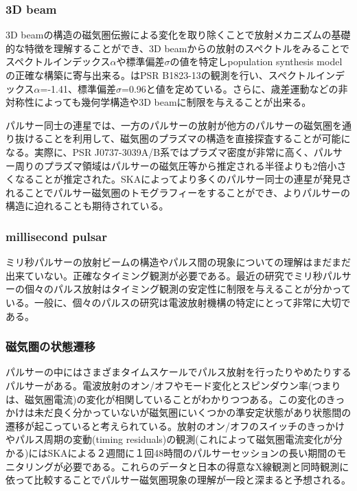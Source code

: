 \subsubsection{3D beam}
3D beamの構造の磁気圏伝搬による変化を取り除くことで放射メカニズムの基礎的な特徴を理解することができ、3D beamからの放射のスペクトルをみることでスペクトルインデックス$\alpha$や標準偏差$\sigma$の値を特定しpopulation synthesis modelの正確な構築に寄与出来る。\cite{Bates13}はPSR B1823-13の観測を行い、スペクトルインデックス$\alpha$=-1.41、標準偏差$\sigma$=0.96と値を定めている。さらに、歳差運動などの非対称性によっても幾何学構造や3D beamに制限を与えることが出来る。

パルサー同士の連星では、一方のパルサーの放射が他方のパルサーの磁気圏を通り抜けることを利用して、磁気圏のプラズマの構造を直接探査することが可能になる。実際に、PSR J0737-3039A/B系ではプラズマ密度が非常に高く、パルサー周りのプラズマ領域はパルサーの磁気圧等から推定される半径よりも2倍小さくなることが推定された\citep{Breton12}。SKAによってより多くのパルサー同士の連星が発見されることでパルサー磁気圏のトモグラフィーをすることができ、よりパルサーの構造に迫れることも期待されている。

\subsubsection{millisecond pulsar}
ミリ秒パルサーの放射ビームの構造やパルス間の現象についての理解はまだまだ出来ていない。正確なタイミング観測が必要である。最近の研究でミリ秒パルサーの個々のパルス放射はタイミング観測の安定性に制限を与えることが分かっている\citep{Oslowski14}。一般に、個々のパルスの研究は電波放射機構の特定にとって非常に大切である。

\subsubsection{磁気圏の状態遷移}
パルサーの中にはさまざまタイムスケールでパルス放射を行ったりやめたりするパルサーがある。電波放射のオン/オフやモード変化とスピンダウン率(つまりは、磁気圏電流)の変化が相関していることがわかりつつある。この変化のきっかけは未だ良く分かっていないが磁気圏にいくつかの準安定状態があり状態間の遷移が起こっていると考えられている。放射のオン/オフのスイッチのきっかけやパルス周期の変動(timing residuals)の観測(これによって磁気圏電流変化が分かる)にはSKAによる２週間に１回48時間のパルサーセッションの長い期間のモニタリングが必要である。これらのデータと日本の得意なX線観測と同時観測に依って比較することでパルサー磁気圏現象の理解が一段と深まると予想される。



